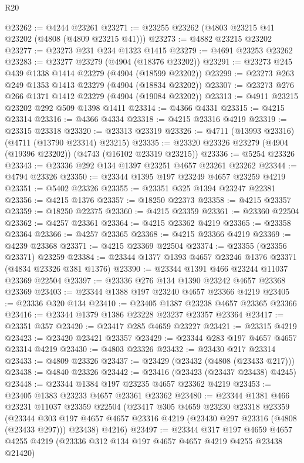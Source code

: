 \begin{lexlean}{R20}
\begin{coremodule}
@23262 := @4244 @23261
@23271 := @23255 @23262 (@4803 @23215 @41 @23202 (@4808 (@4809 @23215 @41)))
@23273 := @4882 @23215 @23202
@23277 := @23273 @231 @234 @1323 @1415
@23279 := @4691 @23253 @23262
@23283 := @23277 @23279 (@4904 (@18376 @23202))
@23291 := @23273 @245 @439 @1338 @1414 @23279 (@4904 (@18599 @23202))
@23299 := @23273 @263 @249 @1353 @1413 @23279 (@4904 (@18834 @23202))
@23307 := @23273 @276 @266 @1371 @1412 @23279 (@4904 (@19084 @23202))
@23313 := @4911 @23215 @23202 @292 @509 @1398 @1411
@23314 := @4366 @4331
@23315 := @4215 @23314
@23316 := @4366 @4334
@23318 := @4215 @23316 @4219
@23319 := @23315 @23318
@23320 := @23313 @23319
@23326 := @4711 (@13993 @23316) (@4711 (@13790 @23314) @23215)
@23335 := @23320 @23326 @23279 (@4904 (@19396 @23202)) (@4743 (@16102 @23319 @23215))
@23336 := @5254 @23326
@23343 := @23336 @292 @134 @1397 @23251 @4657 @23261 @23262
@23344 := @4794 @23326
@23350 := @23344 @1395 @197 @23249 @4657 @23259 @4219
@23351 := @5402 @23326
@23355 := @23351 @325 @1394 @23247 @22381
@23356 := @4215 @1376
@23357 := @18250 @22373
@23358 := @4215 @23357
@23359 := @18250 @22375
@23360 := @4215 @23359
@23361 := @23360 @22504
@23362 := @4257 @23361
@23364 := @4215 @23362 @4219
@23365 := @23358 @23364
@23366 := @4257 @23365
@23368 := @4215 @23366 @4219
@23369 := @4239 @23368
@23371 := @4215 @23369 @22504
@23374 := @23355 (@23356 @23371) @23259
@23384 := @23344 @1377 @1393 @4657 @23246 @1376 @23371 (@4834 @23326 @381 @1376)
@23390 := @23344 @1391 @466 @23244 @11037 @23369 @22504
@23397 := @23336 @276 @134 @1390 @23242 @4657 @23368 @23369
@23403 := @23344 @1388 @197 @23240 @4657 @23366 @4219
@23405 := @23336 @320 @134
@23410 := @23405 @1387 @23238 @4657 @23365 @23366
@23416 := @23344 @1379 @1386 @23228 @23237 @23357 @23364
@23417 := @23351 @357
@23420 := @23417 @285 @4659 @23227
@23421 := @23315 @4219
@23423 := @23420 @23421 @23357
@23429 := @23344 @283 @197 @4657 @4657 @23314 @4219
@23430 := @4803 @23326
@23432 := @23430 @217 @23314
@23433 := @4809 @23326
@23437 := @23429 (@23432 (@4808 (@23433 @217)))
@23438 := @4840 @23326
@23442 := @23416 (@23423 (@23437 @23438) @4245)
@23448 := @23344 @1384 @197 @23235 @4657 @23362 @4219
@23453 := @23405 @1383 @23233 @4657 @23361 @23362
@23480 := @23344
    @1381
    @466
    @23231
    @11037
    @23359
    @22504
    (@23417
      @305
      @4659
      @23230
      @23318
      @23359
      (@23344 @303 @197 @4657 @4657 @23316 @4219 (@23430 @297 @23316 (@4808 (@23433 @297))) @23438)
      @4216)
@23497 := @23344
    @317
    @197
    @4659
    @4657
    @4255
    @4219
    (@23336 @312 @134 @197 @4657 @4657 @4219 @4255 @23438 @21420)

\end{coremodule}
\end{lexlean}
